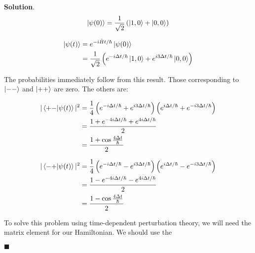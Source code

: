 \documentclass[12pt]{article}
\theoremstyle{definition}
\newenvironment{s}{%
        \begin{trivlist} \item \textbf{Solution}. }{%
            \hspace*{\fill} $\blacksquare$\end{trivlist}}%
\begin{document}
{\begin{s}
\begin{align*}
\ket{\psi(0)} = \frac{1}{\sqrt{2}}\left(\ket{1,0} + \ket{0,0}\right)
\end{align*}

\begin{align*}
\ket{\psi(t)} &= e^{-i\hat{H}t/\hbar}\ket{\psi(0)}\\
&= \frac{1}{\sqrt{2}}\left(e^{-i\Delta t/\hbar}\ket{1,0} + e^{i3\Delta t/\hbar}\ket{0,0}\right)
\end{align*}

The probabilities immediately follow from this result. Those corresponding to $\ket{--}$ and $\ket{++}$ are zero. The others are:

\begin{align*}
|\bra{+-}\ket{\psi(t)}|^{2} &= \frac{1}{4}\left(e^{-i\Delta t/\hbar} + e^{i3\Delta t/\hbar}\right)\left(e^{i\Delta t/\hbar} + e^{-i3\Delta t/\hbar}\right)\\
&= \frac{1+ e^{-4i\Delta t / \hbar} + e^{4i\Delta t / \hbar}}{2}\\
&= \frac{1+\cos\frac{4\Delta t}{\hbar}}{2}
\end{align*}

\begin{align*}
|\bra{-+}\ket{\psi(t)}|^{2} &= \frac{1}{4}\left(e^{-i\Delta t/\hbar} - e^{i3\Delta t/\hbar}\right)\left(e^{i\Delta t/\hbar} - e^{-i3\Delta t/\hbar}\right)\\
&= \frac{1 - e^{-4i\Delta t / \hbar} - e^{4i\Delta t / \hbar}}{2}\\
&= \frac{1-\cos\frac{4\Delta t}{\hbar}}{2}
\end{align*}


To solve this problem using time-dependent perturbation theory, we will need the matrix element for our Hamiltonian. We should use the 



\end{s}
\end{document}
